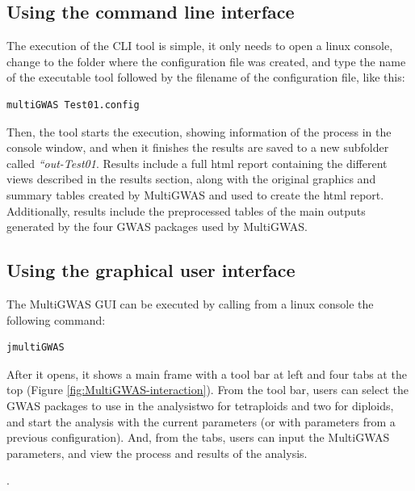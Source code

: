 \documentclass{article}
\begin{document}
\subsection{Using the command line interface}

The execution of the CLI tool is simple, it only needs to open a
linux console, change to the folder where the configuration file was
created, and type the name of the executable tool followed by the
filename of the configuration file, like this:

\begin{lstlisting}[language=bash,basicstyle={\small}]
multiGWAS Test01.config
\end{lstlisting}

Then, the tool starts the execution, showing information of the process
in the console window, and when it finishes the results are saved
to a new subfolder called \emph{``out-Test01}. Results include a
full html report containing the different views described in the results
section, along with the original graphics and summary tables created
by MultiGWAS and used to create the html report. Additionally, results
include the preprocessed tables of the main outputs generated by the
four GWAS packages used by MultiGWAS.

\subsection{Using the graphical user interface}

The MultiGWAS GUI can be executed by calling from a linux console
the following command:

\begin{lstlisting}[language=bash,basicstyle={\small}]
jmultiGWAS
\end{lstlisting}

After it opens, it shows a main frame with a tool bar at left and
four tabs at the top (Figure \ref{fig:MultiGWAS-interaction}). From
the tool bar, users can select the GWAS packages to use in the analysis\textendash two
for tetraploids and two for diploids\textendash , and start the analysis
with the current parameters (or with parameters from a previous configuration).
And, from the tabs, users can input the MultiGWAS parameters, and
view the process and results of the analysis.

.
\end{document}
